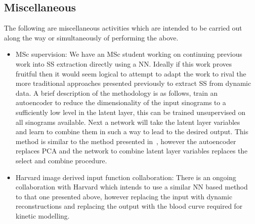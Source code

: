         \subsection{Miscellaneous} \label{sec:future_work_miscellaneous}
            The following are miscellaneous activities which are intended to be carried out along the way or simultaneously of performing the above.
            \begin{itemize}
                \item \gls{MSc} supervision: We have an \gls{MSc} student working on continuing previous work into \gls{SS} extraction directly using a \gls{NN}. Ideally if this work proves fruitful then it would seem logical to attempt to adapt the work to rival the more traditional approaches presented previously to extract \gls{SS} from dynamic data. A brief description of the methodology is as follows, train an autoencoder to reduce the dimensionality of the input sinograms to a sufficiently low level in the latent layer, this can be trained unsupervised on all sinograms available. Next a network will take the latent layer variables and learn to combine them in such a way to lead to the desired output. This method is similar to the method presented in~, however the autoencoder replaces \gls{PCA} and the network to combine latent layer variables replaces the select and combine procedure.
    
                \item Harvard image derived input function collaboration: There is an ongoing collaboration with Harvard which intends to use a similar \gls{NN} based method to that one presented above, however replacing the input with dynamic reconstructions and replacing the output with the blood curve required for kinetic modelling.
            \end{itemize}
